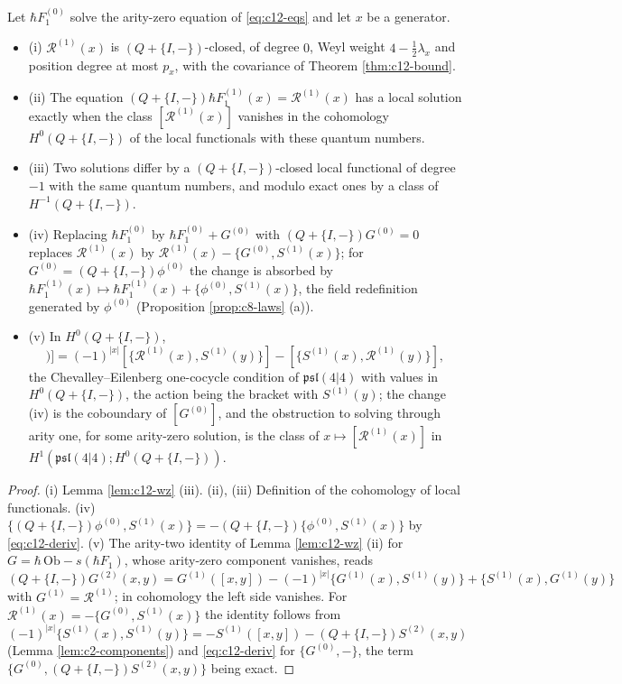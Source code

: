 \begin{theorem}
\label{thm:c12-eq1}
Let $\hbar F_1^{(0)}$ solve the arity-zero equation of \eqref{eq:c12-eqs} and let $x$ be a generator.
\begin{itemize}
\item (i) $\mathcal R^{(1)}(x)$ is $(Q+\{I,-\})$-closed, of degree $0$, Weyl weight $4-\tfrac12\lambda_x$ and position degree at most $p_x$, with the covariance of Theorem \ref{thm:c12-bound}.
\item (ii) The equation $(Q+\{I,-\})\hbar F_1^{(1)}(x)=\mathcal R^{(1)}(x)$ has a local solution exactly when the class $[\mathcal R^{(1)}(x)]$ vanishes in the cohomology $H^0(Q+\{I,-\})$ of the local functionals with these quantum numbers.
\item (iii) Two solutions differ by a $(Q+\{I,-\})$-closed local functional of degree $-1$ with the same quantum numbers, and modulo exact ones by a class of $H^{-1}(Q+\{I,-\})$.
\item (iv) Replacing $\hbar F_1^{(0)}$ by $\hbar F_1^{(0)}+G^{(0)}$ with $(Q+\{I,-\})G^{(0)}=0$ replaces $\mathcal R^{(1)}(x)$ by $\mathcal R^{(1)}(x)-\{G^{(0)},S^{(1)}(x)\}$; for $G^{(0)}=(Q+\{I,-\})\phi^{(0)}$ the change is absorbed by $\hbar F_1^{(1)}(x)\mapsto\hbar F_1^{(1)}(x)+\{\phi^{(0)},S^{(1)}(x)\}$, the field redefinition generated by $\phi^{(0)}$ (Proposition \ref{prop:c8-laws} (a)).
\item (v) In $H^0(Q+\{I,-\})$,
\begin{equation}
[\mathcal R^{(1)}([x,y])]=(-1)^{|x|}[\{\mathcal R^{(1)}(x),S^{(1)}(y)\}]-[\{S^{(1)}(x),\mathcal R^{(1)}(y)\}],
\label{eq:c12-cocycle1}
\end{equation}
the Chevalley--Eilenberg one-cocycle condition of $\mathfrak{psl}(4|4)$ with values in $H^0(Q+\{I,-\})$, the action being the bracket with $S^{(1)}(y)$; the change (iv) is the coboundary of $[G^{(0)}]$, and the obstruction to solving through arity one, for some arity-zero solution, is the class of $x\mapsto[\mathcal R^{(1)}(x)]$ in $H^1(\mathfrak{psl}(4|4);H^0(Q+\{I,-\}))$.
\end{itemize}
\end{theorem}

\begin{proof}
(i) Lemma \ref{lem:c12-wz} (iii). (ii), (iii) Definition of the cohomology of local functionals. (iv) $\{(Q+\{I,-\})\phi^{(0)},S^{(1)}(x)\}=-(Q+\{I,-\})\{\phi^{(0)},S^{(1)}(x)\}$ by \eqref{eq:c12-deriv}. (v) The arity-two identity of Lemma \ref{lem:c12-wz} (ii) for $G=\hbar\,\mathrm{Ob}-s(\hbar F_1)$, whose arity-zero component vanishes, reads $(Q+\{I,-\})G^{(2)}(x,y)=G^{(1)}([x,y])-(-1)^{|x|}\{G^{(1)}(x),S^{(1)}(y)\}+\{S^{(1)}(x),G^{(1)}(y)\}$ with $G^{(1)}=\mathcal R^{(1)}$; in cohomology the left side vanishes. For $\mathcal R^{(1)}(x)=-\{G^{(0)},S^{(1)}(x)\}$ the identity follows from $(-1)^{|x|}\{S^{(1)}(x),S^{(1)}(y)\}=-S^{(1)}([x,y])-(Q+\{I,-\})S^{(2)}(x,y)$ (Lemma \ref{lem:c2-components}) and \eqref{eq:c12-deriv} for $\{G^{(0)},-\}$, the term $\{G^{(0)},(Q+\{I,-\})S^{(2)}(x,y)\}$ being exact.
\end{proof}

